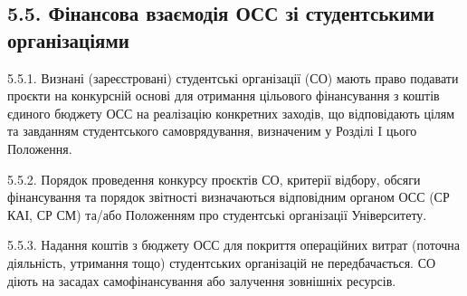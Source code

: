 \subsection*{5.5. Фінансова взаємодія ОСС зі студентськими організаціями}
    5.5.1. Визнані (зареєстровані) студентські організації (СО) мають право подавати проєкти на конкурсній основі для отримання цільового фінансування з коштів єдиного бюджету ОСС на реалізацію конкретних заходів, що відповідають цілям та завданням студентського самоврядування, визначеним у Розділі I цього Положення.

    5.5.2. Порядок проведення конкурсу проєктів СО, критерії відбору, обсяги фінансування та порядок звітності визначаються відповідним органом ОСС (СР КАІ, СР СМ) та/або Положенням про студентські організації Університету.

    5.5.3. Надання коштів з бюджету ОСС для покриття операційних витрат (поточна діяльність, утримання тощо) студентських організацій не передбачається. СО діють на засадах самофінансування або залучення зовнішніх ресурсів.